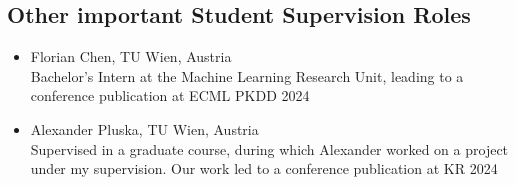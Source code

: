 \documentclass[10pt, a4paper]{article}
\begin{document}
 \subsection*{Other important Student Supervision Roles}
 
 \begin{itemize}
     \item Florian Chen, TU Wien, Austria\\
     Bachelor's Intern at the Machine Learning Research Unit, leading to a conference publication at ECML PKDD 2024
     \item Alexander Pluska,  TU Wien, Austria\\ Supervised in a graduate course, during which Alexander worked on a project under my supervision. Our work led to a conference publication at KR 2024
 \end{itemize}
\end{document}
